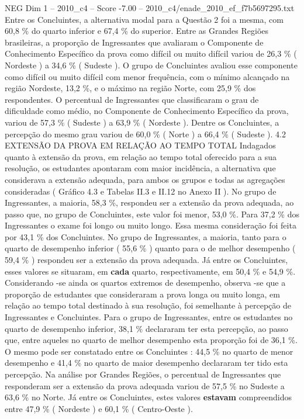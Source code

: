 \begin{textsample}{NEG Dim 1 – 2010\_c4 – Score -7.00 – 2010\_c4/enade\_2010\_ef\_f7b5697295.txt}
Entre os Concluintes, a alternativa modal para a Questão 2 foi a mesma, com 60,8 \% do quarto inferior e 67,4 \% do superior.
Entre as Grandes Regiões brasileiras, a proporção de Ingressantes que avaliaram o Componente de Conhecimento Específico da prova como difícil ou muito difícil variou de 26,3 \% ( Nordeste ) a 34,6 \% ( Sudeste ).
O grupo de Concluintes avaliou esse componente como difícil ou muito difícil com menor frequência, com o mínimo alcançado na região Nordeste, 13,2 \%, e o máximo na região Norte, com 25,9 \% dos respondentes.
O percentual de Ingressantes que classificaram o grau de dificuldade como médio, no Componente de Conhecimento Específico da prova, variou de 57,3 \% ( Sudeste ) a 63,9 \% ( Nordeste ).
Dentre os Concluintes, a percepção do mesmo grau variou de 60,0 \% ( Norte ) a 66,4 \% ( Sudeste ). 4.2 EXTENSÃO DA PROVA EM RELAÇÃO AO TEMPO TOTAL Indagados quanto à extensão da prova, em relação ao tempo total oferecido para a sua resolução, os estudantes apontaram com maior incidência, a alternativa que considerava a extensão adequada, para ambos os grupos e todas as agregações consideradas ( Gráfico 4.3 e Tabelas II.3 e II.12 no Anexo II ).
No grupo de Ingressantes, a maioria, 58,3 \%, respondeu ser a extensão da prova adequada, ao passo que, no grupo de Concluintes, este valor foi menor, 53,0 \%.
Para 37,2 \% dos Ingressantes o exame foi longo ou muito longo.
Essa mesma consideração foi feita por 43,1 \% dos Concluintes.
No grupo de Ingressantes, a maioria, tanto para o quarto de desempenho inferior ( 55,6 \% ) quanto para o de melhor desempenho ( 59,4 \% ) respondeu ser a extensão da prova adequada.
Já entre os Concluintes, esses valores se situaram, em \textbf{cada} quarto, respectivamente, em 50,4 \% e 54,9 \%.
Considerando -se ainda os quartos extremos de desempenho, observa -se que a proporção de estudantes que consideraram a prova longa ou muito longa, em relação ao tempo total destinado à sua resolução, foi semelhante à percepção de Ingressantes e Concluintes.
Para o grupo de Ingressantes, entre os estudantes no quarto de desempenho inferior, 38,1 \% declararam ter esta percepção, ao passo que, entre aqueles no quarto de melhor desempenho esta proporção foi de 36,1 \%.
O mesmo pode ser constatado entre os Concluintes : 44,5 \% no quarto de menor desempenho e 41,4 \% no quarto de maior desempenho declararam ter tido esta percepção.
Na análise por Grandes Regiões, o percentual de Ingressantes que responderam ser a extensão da prova adequada variou de 57,5 \% no Sudeste a 63,6 \% no Norte.
Já entre os Concluintes, estes valores \textbf{estavam} compreendidos entre 47,9 \% ( Nordeste ) e 60,1 \% ( Centro-Oeste ).

\end{textsample}

